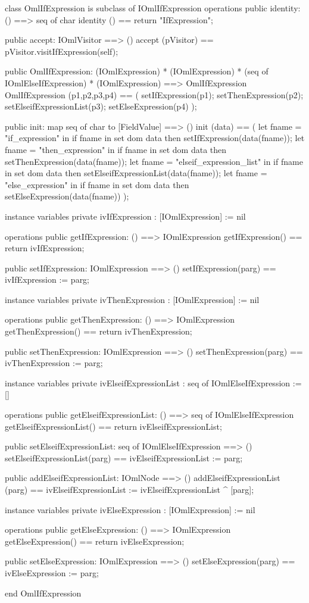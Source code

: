 \begin{vdm_al}
class OmlIfExpression is subclass of IOmlIfExpression
operations
  public identity: () ==> seq of char
  identity () == return "IfExpression";

  public accept: IOmlVisitor ==> ()
  accept (pVisitor) == pVisitor.visitIfExpression(self);

  public OmlIfExpression:
      (IOmlExpression) *
      (IOmlExpression) *
      (seq of IOmlElseIfExpression) *
      (IOmlExpression) ==> OmlIfExpression
  OmlIfExpression (p1,p2,p3,p4) == 
   ( setIfExpression(p1);
     setThenExpression(p2);
     setElseifExpressionList(p3);
     setElseExpression(p4) );

  public init: map seq of char to [FieldValue] ==> ()
  init (data) ==
    ( let fname = "if_expression" in
        if fname in set dom data
        then setIfExpression(data(fname));
      let fname = "then_expression" in
        if fname in set dom data
        then setThenExpression(data(fname));
      let fname = "elseif_expression_list" in
        if fname in set dom data
        then setElseifExpressionList(data(fname));
      let fname = "else_expression" in
        if fname in set dom data
        then setElseExpression(data(fname)) );

instance variables
  private ivIfExpression : [IOmlExpression] := nil

operations
  public getIfExpression: () ==> IOmlExpression
  getIfExpression() == return ivIfExpression;

  public setIfExpression: IOmlExpression ==> ()
  setIfExpression(parg) == ivIfExpression := parg;

instance variables
  private ivThenExpression : [IOmlExpression] := nil

operations
  public getThenExpression: () ==> IOmlExpression
  getThenExpression() == return ivThenExpression;

  public setThenExpression: IOmlExpression ==> ()
  setThenExpression(parg) == ivThenExpression := parg;

instance variables
  private ivElseifExpressionList : seq of IOmlElseIfExpression := []

operations
  public getElseifExpressionList: () ==> seq of IOmlElseIfExpression
  getElseifExpressionList() == return ivElseifExpressionList;

  public setElseifExpressionList: seq of IOmlElseIfExpression ==> ()
  setElseifExpressionList(parg) == ivElseifExpressionList := parg;

  public addElseifExpressionList: IOmlNode ==> ()
  addElseifExpressionList (parg) == ivElseifExpressionList := ivElseifExpressionList ^ [parg];

instance variables
  private ivElseExpression : [IOmlExpression] := nil

operations
  public getElseExpression: () ==> IOmlExpression
  getElseExpression() == return ivElseExpression;

  public setElseExpression: IOmlExpression ==> ()
  setElseExpression(parg) == ivElseExpression := parg;

end OmlIfExpression
\end{vdm_al}

